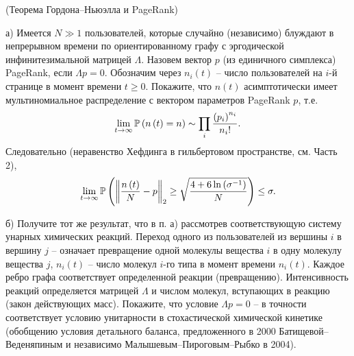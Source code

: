 \begin{problem} (Теорема Гордона--Ньюэлла и PageRank)

а) Имеется $N\gg 
1$ пользователей, которые случайно (независимо) блуждают в непрерывном 
времени по ориентированному графу с эргодической инфинитезимальной матрицей 
$\Lambda $. Назовем вектор $p$ (из единичного симплекса) PageRank, если 
$\Lambda p=0$. Обозначим через $n_i \left( t \right)$ -- число пользователей 
на $i$-й странице в момент времени $t\ge 0$. Покажите, что $n\left( t 
\right)$ асимптотически имеет мультиномиальное распределение с вектором 
параметров PageRank $p$, т.е.
\[
\mathop {\lim }\limits_{t\to \infty } \mathrm{{\mathbb P}}\left( {n\left( t \right)=n} 
\right)\sim \prod\limits_i {\frac{\left( {p_i } \right)^{n_i }}{n_i !}} .
\]
Следовательно (неравенство Хефдинга в гильбертовом пространстве, см. Часть 2),
\[
\mathop {\lim }\limits_{t\to \infty } \mathrm{{\mathbb P}}\left( {\left\| {\frac{n\left( t 
\right)}{N}-p} \right\|_2 \ge \sqrt {\frac{4+6\ln \left( {\sigma ^{-1}} 
\right)}{N}} } \right)\le \sigma .
\]

б) Получите тот же результат, что в п. а) рассмотрев 
соответствующую систему унарных химических реакций. Переход одного из 
пользователей из вершины $i$ в вершину $j$ -- означает превращение одной 
молекулы вещества $i$ в одну молекулу вещества $j$, $n_i \left( t \right)$ 
-- число молекул $i$-го типа в момент времени $n_i \left( t \right)$. Каждое 
ребро графа соответствует определенной реакции (превращению). Интенсивность 
реакций определяется матрицей $\Lambda $ и числом молекул, вступающих в 
реакцию (закон действующих масс). Покажите, что условие $\Lambda p=0$ -- в 
точности соответствует условию унитарности в стохастической химической 
кинетике (обобщению условия детального баланса, предложенного в 2000 
Батищевой--Веденяпиным и независимо Малышевым--Пироговым--Рыбко в 2004). 

\end{problem}

